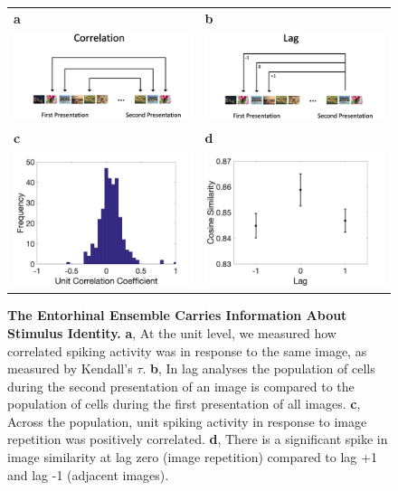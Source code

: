 \documentclass{apa}
\begin{document}




\begin{figure}
\begin{tabular}{l l}
\textbf{a}
&\textbf{b}\\
\includegraphics[width =.48\textwidth]{figs/CorrS.png}
&\includegraphics[width = .48\textwidth]{figs/JBITS.png}\\
\textbf{c}
&\textbf{d}\\
\includegraphics[width = .5\textwidth]{figs/CorrDist.png}
&\includegraphics[width = .5\textwidth]{figs/JBIT2.png}
\end{tabular}
\caption{ \textbf{The Entorhinal Ensemble Carries Information About Stimulus Identity.}
\textbf{a}, At the unit level, we measured how correlated spiking activity was in response to the 
same image, as measured by Kendall's $\tau$.
\textbf{b}, In lag analyses the population of cells during the second
presentation of an image is compared to the population of cells during the
first presentation of all images. \textbf{c}, Across the population, unit spiking activity in
response to image repetition was positively correlated. \textbf{d}, There is a significant spike in image
similarity at lag zero (image repetition) compared to lag +1 and lag -1 (adjacent images).} 
\label{fig:StimInfo} 
\end{figure}
\end{document}
